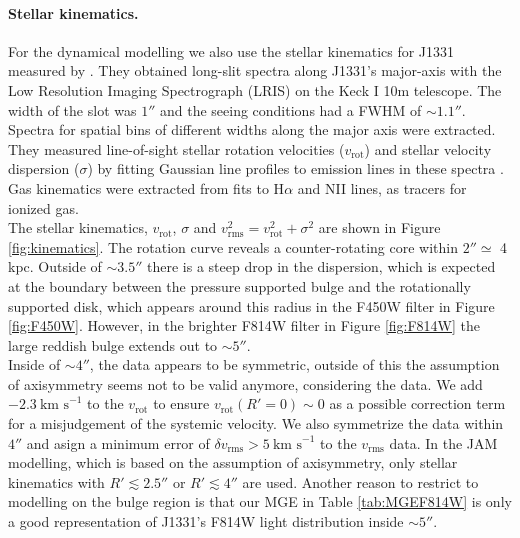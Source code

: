 \paragraph{Stellar kinematics.} For the dynamical modelling we also use the stellar kinematics for J1331 measured by \citet{SWELLSV}. They obtained long-slit spectra along J1331's major-axis with the Low Resolution Imaging Spectrograph (LRIS) on the Keck I 10m telescope. The width of the slot was $1''$ and the seeing conditions had a FWHM of $\sim 1.1''$. Spectra for spatial bins of different widths along the major axis were extracted. They measured line-of-sight stellar rotation velocities ($v_\text{rot}$) and stellar velocity dispersion ($\sigma$) by fitting Gaussian line profiles to emission  lines in these spectra . Gas kinematics were extracted from fits to H$\alpha$ and NII lines, as tracers for ionized gas.
\\The stellar kinematics, $v_\text{rot}$, $\sigma$ and $v_\text{rms}^2=v_\text{rot}^2 + \sigma^2$ are shown in Figure \ref{fig:kinematics}. The rotation curve reveals a counter-rotating core within $2''\simeq$ 4 kpc. Outside of $\sim 3.5''$ there is a steep drop in the dispersion, which is expected at the boundary between the pressure supported bulge and the rotationally supported disk, which appears around this radius in the F450W filter in Figure \ref{fig:F450W}. However, in the brighter F814W filter in Figure \ref{fig:F814W}  the large reddish bulge extends out to $\sim5''$. 
\\Inside of $\sim 4''$, the data appears to be symmetric, outside of this the assumption of axisymmetry seems not to be valid anymore, considering the data. We add $-2.3~\text{km s}^{-1}$ to the $v_\text{rot}$ to ensure $v_\text{rot}(R'=0) \sim 0$ as a possible correction term for a misjudgement of the systemic velocity. We also symmetrize the data within $4''$ and asign a minimum error of $\delta v_\text{rms} > 5~\text{km s}^{-1}$ to the $v_\text{rms}$ data. In the JAM modelling, which is based on the assumption of axisymmetry, only stellar kinematics with $R'  \lesssim 2.5''$ or $R' \lesssim 4''$ are used. Another reason to restrict to modelling on the bulge region is that our MGE in Table \ref{tab:MGEF814W} is only a good representation of J1331's F814W light distribution inside $\sim 5''$.

 
 \Wilma{[TO DO: Include better in data section. "of approximate Hubble type Sb at right ascension = 202.91800$^\circ$ and a declination = 36.46999$^\circ$ (epoch J2000)"]}